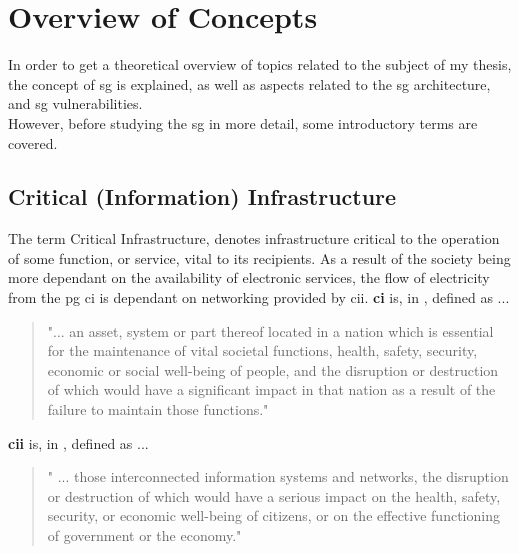  \chapter{Overview of Concepts} 
 
In order to get a theoretical overview of topics related to the subject of my thesis, the concept of \acrfull{sg} is explained, as well as aspects related to the \acrshort{sg} architecture, and \acrshort{sg} vulnerabilities.\\  

However, before studying the \acrshort{sg} in more detail,  some introductory terms are covered.  



\section{Critical (Information) Infrastructure}

The term Critical Infrastructure, denotes infrastructure critical to the operation of some function, or service, vital to its recipients. As a result of the society being more dependant on the availability of electronic services, the flow of electricity from the \acrshort{pg} \acrfull{ci} is dependant on networking provided by \acrfull{cii}.
\textbf{\acrfull{ci}} is, in  \cite{luiijf2012understanding}, defined as ... 
 \begin{quote}
"... an asset, system or part thereof located in a
nation which is essential for the maintenance of vital societal functions, health, safety,
security, economic or social well-being of people, and the disruption or destruction of
which would have a significant impact in that nation as a result of the failure to maintain
those functions." \cite[p. 53]{luiijf2012understanding}     
 \end{quote}
 

\textbf{\acrfull{cii}} is, in  \cite{luiijf2012understanding}, defined as ...
 \begin{quote}
" ... those interconnected information
systems and networks, the disruption or destruction of which would have a
serious impact on the health, safety, security, or economic well-being of citizens, or
on the effective functioning of government or the economy." \cite[p. 53]{luiijf2012understanding}     
 \end{quote}


